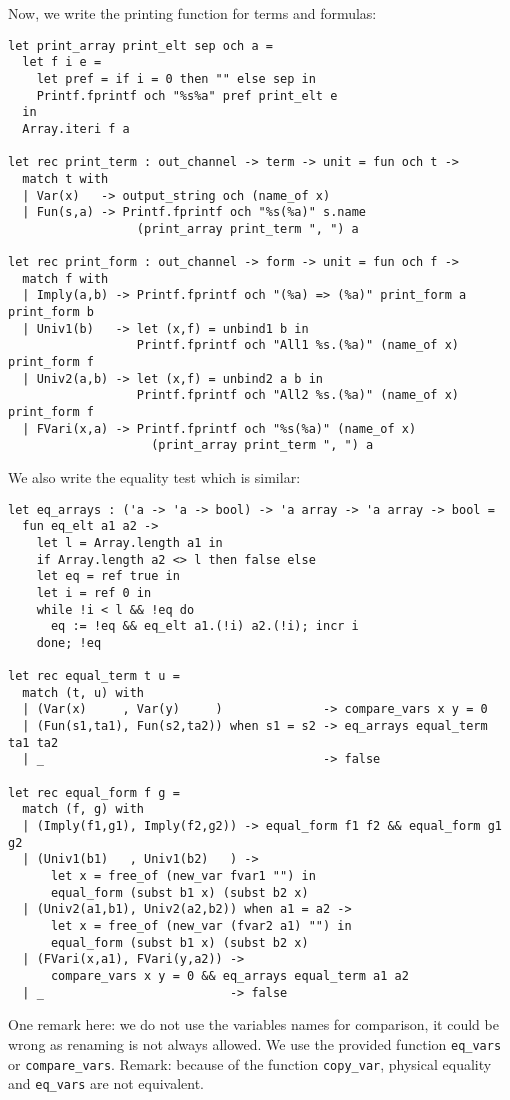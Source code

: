 \documentclass[11pt]{article}
\begin{document}
Now, we write the printing function for terms and formulas:

\begin{verbatim}
let print_array print_elt sep och a =
  let f i e =
    let pref = if i = 0 then "" else sep in
    Printf.fprintf och "%s%a" pref print_elt e
  in
  Array.iteri f a

let rec print_term : out_channel -> term -> unit = fun och t ->
  match t with
  | Var(x)   -> output_string och (name_of x)
  | Fun(s,a) -> Printf.fprintf och "%s(%a)" s.name
                  (print_array print_term ", ") a

let rec print_form : out_channel -> form -> unit = fun och f ->
  match f with
  | Imply(a,b) -> Printf.fprintf och "(%a) => (%a)" print_form a print_form b
  | Univ1(b)   -> let (x,f) = unbind1 b in
                  Printf.fprintf och "All1 %s.(%a)" (name_of x) print_form f
  | Univ2(a,b) -> let (x,f) = unbind2 a b in
                  Printf.fprintf och "All2 %s.(%a)" (name_of x) print_form f
  | FVari(x,a) -> Printf.fprintf och "%s(%a)" (name_of x)
                    (print_array print_term ", ") a
\end{verbatim}

We also write the equality test which is similar:
\begin{verbatim}
let eq_arrays : ('a -> 'a -> bool) -> 'a array -> 'a array -> bool =
  fun eq_elt a1 a2 ->
    let l = Array.length a1 in
    if Array.length a2 <> l then false else
    let eq = ref true in
    let i = ref 0 in
    while !i < l && !eq do
      eq := !eq && eq_elt a1.(!i) a2.(!i); incr i
    done; !eq

let rec equal_term t u =
  match (t, u) with
  | (Var(x)     , Var(y)     )              -> compare_vars x y = 0
  | (Fun(s1,ta1), Fun(s2,ta2)) when s1 = s2 -> eq_arrays equal_term ta1 ta2
  | _                                       -> false

let rec equal_form f g =
  match (f, g) with
  | (Imply(f1,g1), Imply(f2,g2)) -> equal_form f1 f2 && equal_form g1 g2
  | (Univ1(b1)   , Univ1(b2)   ) ->
      let x = free_of (new_var fvar1 "") in
      equal_form (subst b1 x) (subst b2 x)
  | (Univ2(a1,b1), Univ2(a2,b2)) when a1 = a2 ->
      let x = free_of (new_var (fvar2 a1) "") in
      equal_form (subst b1 x) (subst b2 x)
  | (FVari(x,a1), FVari(y,a2)) ->
      compare_vars x y = 0 && eq_arrays equal_term a1 a2
  | _                          -> false
\end{verbatim}

One remark here: we do not use the variables names for comparison,
it could be wrong as renaming is not always allowed. We use the
provided
function \verb#eq_vars# or \verb#compare_vars#.
Remark: because of the function \verb#copy_var#, physical equality
and \verb#eq_vars# are not equivalent.
\end{document}
